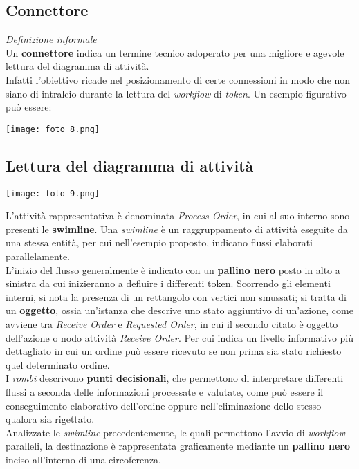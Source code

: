 \documentclass{article}
\begin{document}
\subsection*{Connettore}
\textit{Definizione informale}\\Un \textbf{connettore} indica un termine tecnico adoperato per una migliore e agevole lettura del diagramma di attività.\vspace*{14pt}\\
Infatti l'obiettivo ricade nel posizionamento di certe connessioni in modo che non siano di intralcio durante la lettura del \textit{workflow} di \textit{token}. Un esempio figurativo può essere:\\
\begin{center}
    \texttt{[image: foto 8.png]}
\end{center}

\subsection*{Lettura del diagramma di attività}
\large
\begin{center}
    \texttt{[image: foto 9.png]}
\end{center}
L'attività rappresentativa è denominata \textit{Process Order}, in cui al suo interno sono presenti le \textbf{swimline}. Una \textit{swimline} è un raggruppamento di attività eseguite da una stessa entità, per cui nell'esempio proposto, indicano flussi elaborati parallelamente.\vspace*{14pt}\\
L'inizio del flusso generalmente è indicato con un \textbf{pallino nero} posto in alto a sinistra da cui inizieranno a defluire i differenti token. Scorrendo gli elementi interni, si nota la presenza di un rettangolo con vertici non smussati; si tratta di un \textbf{oggetto}, ossia un'istanza che descrive uno stato aggiuntivo di un'azione, come avviene tra \textit{Receive Order} e \textit{Requested Order}, in cui il secondo citato è oggetto dell'azione o nodo attività \textit{Receive Order}. Per cui indica un livello informativo più dettagliato in cui un ordine può essere ricevuto se non prima sia stato richiesto quel determinato ordine.\vspace*{14pt}\\
I \textit{rombi} descrivono \textbf{punti decisionali}, che permettono di interpretare differenti flussi a seconda delle informazioni processate e valutate, come può essere il conseguimento elaborativo dell'ordine oppure nell'eliminazione dello stesso qualora sia rigettato.\vspace*{14pt}\\
Analizzate le \textit{swimline} precedentemente, le quali permettono l'avvio di \textit{workflow} paralleli, la destinazione è rappresentata graficamente mediante un \textbf{pallino nero} inciso all'interno di una circoferenza.
\end{document}
